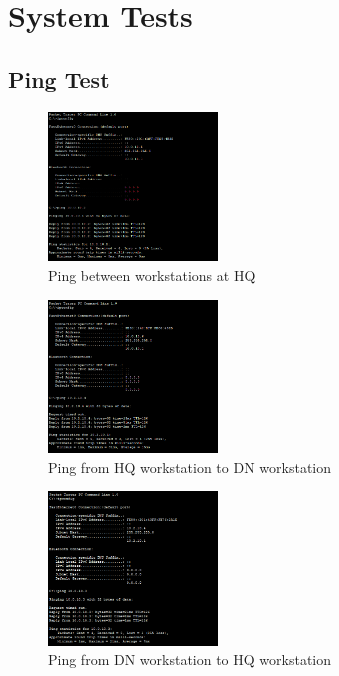 \section{System Tests}
\subsection{Ping Test}

\begin{figure}[H]
  \centering
  \includegraphics[width=0.4\textwidth]{./assets/ping.hqw-hqw.png}
  \caption{Ping between workstations at HQ}
\end{figure}

\begin{figure}[H]
  \centering
  \includegraphics[width=0.4\textwidth]{./assets/ping.hqw-dnw.png}
  \caption{Ping from HQ workstation to DN workstation}
\end{figure}

\begin{figure}[H]
  \centering
  \includegraphics[width=0.4\textwidth]{./assets/ping.dnw-hqw.png}
  \caption{Ping from DN workstation to HQ workstation}
\end{figure}

